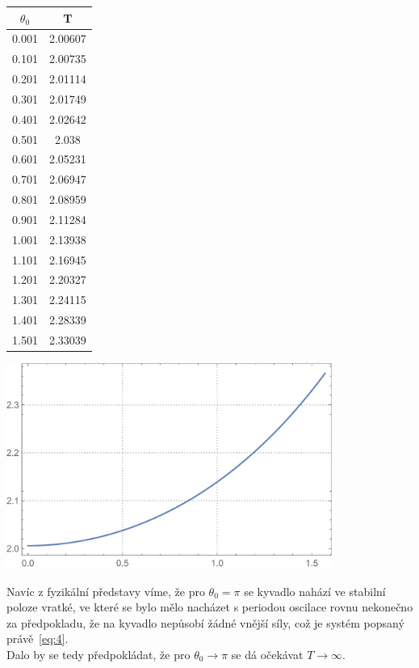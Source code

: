 \documentclass[reqno, a4paper]{amsart}
\begin{document}
		\begin{minipage}{\textwidth}
			\begin{minipage}[b]{0.25\textwidth}
				\centering
				\begin{tabular}{|c|c|}
					\hline
					$\theta_{0}$ & T \\ 
					\hline
					0.001& 2.00607\\0.101& 2.00735\\0.201& 2.01114\\0.301& 2.01749\\0.401& 2.02642\\0.501& 2.038\\0.601& 2.05231\\0.701& 2.06947\\0.801& 2.08959\\0.901& 2.11284\\
					1.001& 2.13938\\1.101& 2.16945\\1.201& 2.20327\\1.301& 2.24115\\1.401& 2.28339\\1.501& 2.33039\\
					\hline
				\end{tabular}
			\end{minipage}
			\begin{minipage}[b]{0.79\textwidth}
				\centering
				\includegraphics[width=0.8\textwidth]{Elipticky integral, Perioda}
			\end{minipage}
			\hfill
		\end{minipage}
			Navíc z fyzikální představy víme, že pro $\theta_{0}=\pi$ se kyvadlo nahází ve stabilní poloze vratké, ve které se bylo mělo nacházet s periodou oscilace rovnu nekonečno za předpokladu, že na kyvadlo nepůsobí žádné vnější síly, což je systém popsaný právě~\eqref{eq:4}.
\\
Dalo by se tedy předpokládat, že pro $\theta_{0} \longrightarrow \pi$ se dá očekávat $T\longrightarrow \infty $.
\end{document}
